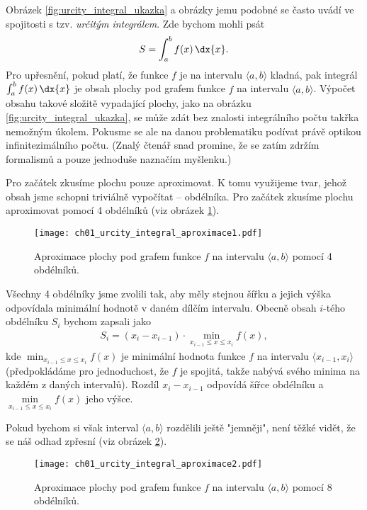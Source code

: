 Obrázek \ref{fig:urcity_integral_ukazka} a obrázky jemu podobné se často uvádí ve spojitosti s tzv. \emph{určitým integrálem}. Zde bychom mohli psát
\begin{align*}
S=\int_{a}^{b}{f(x)\,\dx{x}}.
\end{align*}
Pro upřesnění, pokud platí, že funkce $f$ je na intervalu $\langle a,b \rangle$ kladná, pak integrál $\int_a^b{f(x)\,\dx{x}}$ je obsah plochy pod grafem funkce $f$ na intervalu $\langle a,b \rangle$. Výpočet obsahu takové složitě vypadající plochy, jako na obrázku \ref{fig:urcity_integral_ukazka}, se může zdát bez znalosti integrálního počtu takřka nemožným úkolem. Pokusme se ale na danou problematiku podívat právě optikou infinitezimálního počtu. (Znalý čtenář snad promine, že se zatím zdržím formalismů a pouze jednoduše naznačím myšlenku.)\par
Pro začátek zkusíme plochu pouze aproximovat. K tomu využijeme tvar, jehož obsah jsme schopni triviálně vypočítat -- obdélníka. Pro začátek zkusíme plochu aproximovat pomocí 4 obdélníků (viz obrázek \ref{fig:urcity_integral_aproximace1}).
\begin{figure}[h]
	\centering	\texttt{[image: ch01\_urcity\_integral\_aproximace1.pdf]}
	\caption{Aproximace plochy pod grafem funkce $f$ na intervalu $\langle a,b \rangle$ pomocí 4 obdélníků.}
	\label{fig:urcity_integral_aproximace1}
\end{figure}
Všechny 4 obdélníky jsme zvolili tak, aby měly stejnou šířku a jejich výška odpovídala minimální hodnotě v daném dílčím intervalu. Obecně obsah $i$-tého obdélníku $S_i$ bychom zapsali jako
\begin{align*}
S_i= (x_i-x_{i-1}) \cdot \min\limits_{x_{i-1} \leq x \leq x_i}{f(x)},
\end{align*}
kde $\min_{x_{i-1} \leq x \leq x_i}{f(x)}$ je minimální hodnota funkce $f$ na intervalu $\langle x_{i-1},x_i \rangle$ (předpokládáme pro jednoduchost, že $f$ je spojitá, takže nabývá svého minima na každém z daných intervalů). Rozdíl $x_i-x_{i-1}$ odpovídá šířce obdélníku a $\min\limits_{x_{i-1} \leq x \leq x_i}{f(x)}$ jeho výšce.\par
Pokud bychom si však interval $\langle a,b \rangle$ rozdělili ještě "jemněji", není těžké vidět, že se náš odhad zpřesní (viz obrázek \ref{fig:urcity_integral_aproximace2}).
\begin{figure}[h]
	\centering	\texttt{[image: ch01\_urcity\_integral\_aproximace2.pdf]}
	\caption{Aproximace plochy pod grafem funkce $f$ na intervalu $\langle a,b \rangle$ pomocí 8 obdélníků.}
	\label{fig:urcity_integral_aproximace2}
\end{figure}
